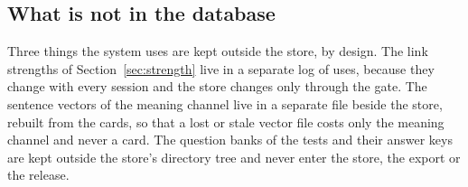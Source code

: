 \subsection{What is not in the database}
Three things the system uses are kept outside the store, by design. The link strengths of Section~\ref{sec:strength} live in a separate log of uses, because they change with every session and the store changes only through the gate. The sentence vectors of the meaning channel live in a separate file beside the store, rebuilt from the cards, so that a lost or stale vector file costs only the meaning channel and never a card. The question banks of the tests and their answer keys are kept outside the store's directory tree and never enter the store, the export or the release.
